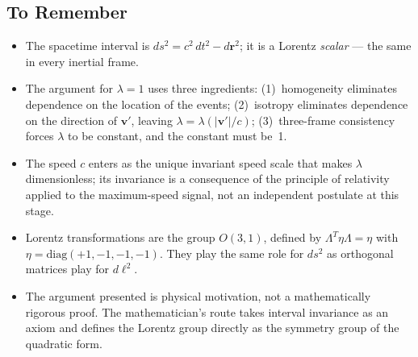 \subsection*{To Remember}

\begin{itemize}
  \item The spacetime interval is
    $ds^2 = c^2\,dt^2 - d\mathbf{r}^2$; it is a Lorentz
    \emph{scalar} — the same in every inertial frame.
  \item The argument for $\lambda = 1$ uses three ingredients:
    (1)~homogeneity eliminates dependence on the location of the
    events; (2)~isotropy eliminates dependence on the direction of
    $\mathbf{v}'$, leaving $\lambda = \lambda(|\mathbf{v}'|/c)$;
    (3)~three-frame consistency forces $\lambda$ to be constant,
    and the constant must be~1.
  \item The speed $c$ enters as the unique invariant speed scale that
    makes $\lambda$ dimensionless; its invariance is a consequence of
    the principle of relativity applied to the maximum-speed signal,
    not an independent postulate at this stage.
  \item Lorentz transformations are the group $O(3,1)$, defined by
    $\Lambda^T \eta \Lambda = \eta$ with
    $\eta = \mathrm{diag}(+1,-1,-1,-1)$.  They play the same role
    for $ds^2$ as orthogonal matrices play for $d\ell^2$.
  \item The argument presented is physical motivation, not a
    mathematically rigorous proof.  The mathematician's route takes
    interval invariance as an axiom and defines the Lorentz group
    directly as the symmetry group of the quadratic form.
\end{itemize}

